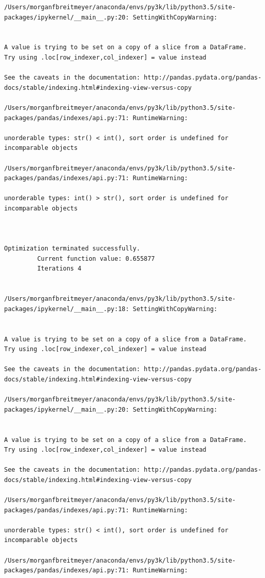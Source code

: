 \begin{lstlisting}
/Users/morganfbreitmeyer/anaconda/envs/py3k/lib/python3.5/site-packages/ipykernel/__main__.py:20: SettingWithCopyWarning:


A value is trying to be set on a copy of a slice from a DataFrame.
Try using .loc[row_indexer,col_indexer] = value instead

See the caveats in the documentation: http://pandas.pydata.org/pandas-docs/stable/indexing.html#indexing-view-versus-copy

/Users/morganfbreitmeyer/anaconda/envs/py3k/lib/python3.5/site-packages/pandas/indexes/api.py:71: RuntimeWarning:

unorderable types: str() < int(), sort order is undefined for incomparable objects

/Users/morganfbreitmeyer/anaconda/envs/py3k/lib/python3.5/site-packages/pandas/indexes/api.py:71: RuntimeWarning:

unorderable types: int() > str(), sort order is undefined for incomparable objects



Optimization terminated successfully.
         Current function value: 0.655877
         Iterations 4


/Users/morganfbreitmeyer/anaconda/envs/py3k/lib/python3.5/site-packages/ipykernel/__main__.py:18: SettingWithCopyWarning:


A value is trying to be set on a copy of a slice from a DataFrame.
Try using .loc[row_indexer,col_indexer] = value instead

See the caveats in the documentation: http://pandas.pydata.org/pandas-docs/stable/indexing.html#indexing-view-versus-copy

/Users/morganfbreitmeyer/anaconda/envs/py3k/lib/python3.5/site-packages/ipykernel/__main__.py:20: SettingWithCopyWarning:


A value is trying to be set on a copy of a slice from a DataFrame.
Try using .loc[row_indexer,col_indexer] = value instead

See the caveats in the documentation: http://pandas.pydata.org/pandas-docs/stable/indexing.html#indexing-view-versus-copy

/Users/morganfbreitmeyer/anaconda/envs/py3k/lib/python3.5/site-packages/pandas/indexes/api.py:71: RuntimeWarning:

unorderable types: str() < int(), sort order is undefined for incomparable objects

/Users/morganfbreitmeyer/anaconda/envs/py3k/lib/python3.5/site-packages/pandas/indexes/api.py:71: RuntimeWarning:


\end{lstlisting}
